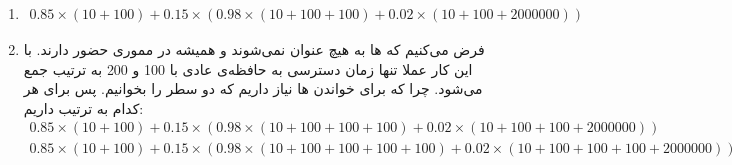 \begin{enumerate}
    \item \begin{gather*}
        0.85 \times (10 + 100) + 0.15 \times (0.98 \times (10 + 100 + 100) + 0.02 \times (10 + 100 + 2000000))
    \end{gather*}
    \item فرض می‌کنیم که ها
    به هیچ عنوان
    نمی‌شوند و همیشه در مموری حضور دارند. با این کار عملا تنها زمان دسترسی به حافظه‌ی عادی با 100 و 200 به ترتیب جمع می‌شود.
    چرا که برای خواندن
    ها
    نیاز داریم که دو سطر
    را بخوانیم. پس برای هر کدام به ترتیب داریم:
    \begin{gather*}
        0.85 \times (10 + 100) + 0.15 \times (0.98 \times (10 + 100 + 100 + 100) + 0.02 \times (10 + 100 + 100 + 2000000))\\
        0.85 \times (10 + 100) + 0.15 \times (0.98 \times (10 + 100 + 100 + 100 + 100) + 0.02 \times (10 + 100 + 100 + 100 + 2000000))
    \end{gather*}
\end{enumerate}

